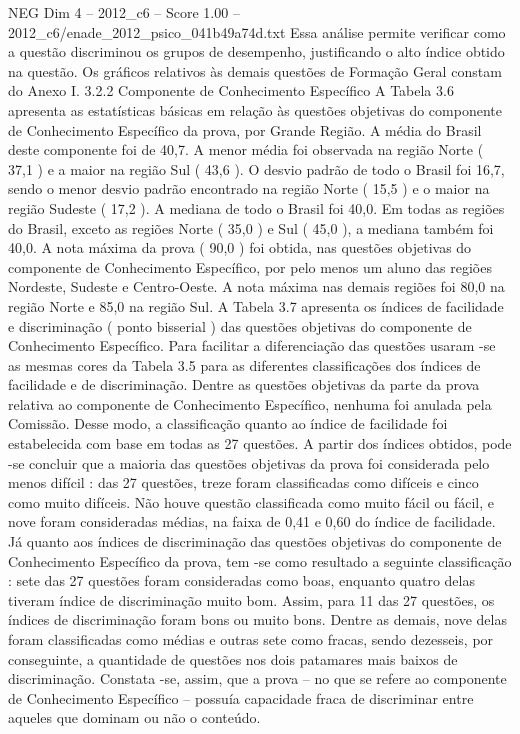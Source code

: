 \begin{textsample}{NEG Dim 4 – 2012\_c6 – Score 1.00 – 2012\_c6/enade\_2012\_psico\_041b49a74d.txt}
Essa análise permite verificar como a questão discriminou os grupos de desempenho, justificando o alto índice obtido na questão.
Os gráficos relativos às demais questões de Formação Geral constam do Anexo I. 3.2.2 Componente de Conhecimento Específico A Tabela 3.6 apresenta as estatísticas básicas em relação às questões objetivas do componente de Conhecimento Específico da prova, por Grande Região.
A média do Brasil deste componente foi de 40,7.
A menor média foi observada na região Norte ( 37,1 ) e a maior na região Sul ( 43,6 ).
O desvio padrão de todo o Brasil foi 16,7, sendo o menor desvio padrão encontrado na região Norte ( 15,5 ) e o maior na região Sudeste ( 17,2 ).
A mediana de todo o Brasil foi 40,0.
Em todas as regiões do Brasil, exceto as regiões Norte ( 35,0 ) e Sul ( 45,0 ), a mediana também foi 40,0.
A nota máxima da prova ( 90,0 ) foi obtida, nas questões objetivas do componente de Conhecimento Específico, por pelo menos um aluno das regiões Nordeste, Sudeste e Centro-Oeste.
A nota máxima nas demais regiões foi 80,0 na região Norte e 85,0 na região Sul.
A Tabela 3.7 apresenta os índices de facilidade e discriminação ( ponto bisserial ) das questões objetivas do componente de Conhecimento Específico.
Para facilitar a diferenciação das questões usaram -se as mesmas cores da Tabela 3.5 para as diferentes classificações dos índices de facilidade e de discriminação.
Dentre as questões objetivas da parte da prova relativa ao componente de Conhecimento Específico, nenhuma foi anulada pela Comissão.
Desse modo, a classificação quanto ao índice de facilidade foi estabelecida com base em todas as 27 questões.
A partir dos índices obtidos, pode -se concluir que a maioria das questões objetivas da prova foi considerada pelo menos difícil : das 27 questões, treze foram classificadas como difíceis e cinco como muito difíceis.
Não houve questão classificada como muito fácil ou fácil, e nove foram consideradas médias, na faixa de 0,41 e 0,60 do índice de facilidade.
Já quanto aos índices de discriminação das questões objetivas do componente de Conhecimento Específico da prova, tem -se como resultado a seguinte classificação : sete das 27 questões foram consideradas como boas, enquanto quatro delas tiveram índice de discriminação muito bom.
Assim, para 11 das 27 questões, os índices de discriminação foram bons ou muito bons.
Dentre as demais, nove delas foram classificadas como médias e outras sete como fracas, sendo dezesseis, por conseguinte, a quantidade de questões nos dois patamares mais baixos de discriminação.
Constata -se, assim, que a prova – no que se refere ao componente de Conhecimento Específico – possuía capacidade fraca de discriminar entre aqueles que dominam ou não o conteúdo.

\end{textsample}
